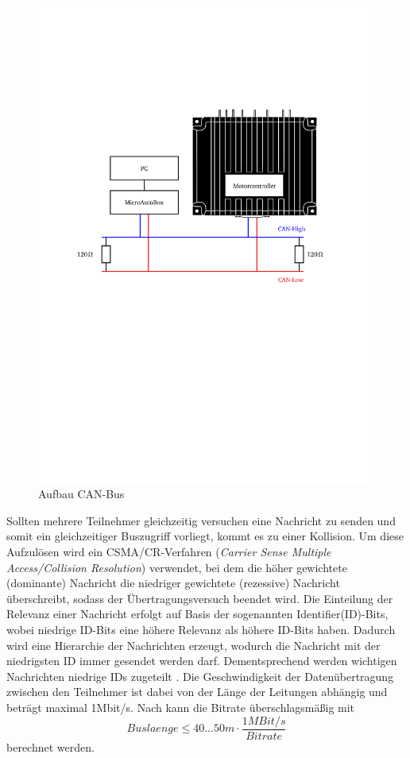 \begin{figure}[h]
	\centering
		\includegraphics{Bilder/CAN.pdf}
	\caption{Aufbau CAN-Bus \cite[S.158]{manual}}
	\label{fig:CAN}
\end{figure}


Sollten mehrere Teilnehmer gleichzeitig versuchen eine Nachricht zu senden und somit ein gleichzeitiger Buszugriff vorliegt, kommt es zu einer Kollision. Um diese Aufzulösen wird ein CSMA/CR-Verfahren (\textit{Carrier Sense Multiple Access/Collision Resolution}) verwendet, bei dem die höher gewichtete (dominante) Nachricht die niedriger gewichtete (rezessive) Nachricht überschreibt, sodass der Übertragungsversuch beendet wird. Die Einteilung der Relevanz einer Nachricht erfolgt auf Basis der sogenannten Identifier(ID)-Bits, wobei niedrige ID-Bits eine höhere Relevanz als höhere ID-Bits haben. Dadurch wird eine Hierarchie der Nachrichten erzeugt, wodurch die Nachricht mit der niedrigsten ID immer gesendet werden darf. Dementsprechend werden wichtigen Nachrichten niedrige IDs zugeteilt \cite{Lawrenz2010}. 
Die Geschwindigkeit der Datenübertragung zwischen den Teilnehmer ist dabei von der Länge der Leitungen abhängig und beträgt maximal 1Mbit/s. Nach \cite[S.58]{Werner2014} kann die Bitrate überschlagsmäßig mit 
\begin{equation}
	Buslaenge\leq 40...50 m\cdot \frac{1MBit/s}{Bitrate}
	\label{eq:CAN}
\end{equation}
berechnet werden.

